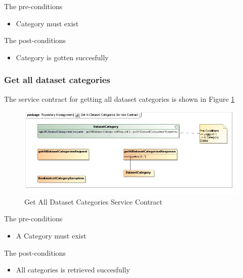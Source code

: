 The pre-conditions
\begin{itemize}
  \item Category must exist
\end{itemize}

The post-conditions
\begin{itemize}
  \item Category is gotten succesfully
\end{itemize}

\subsubsection {Get all dataset categories}

The service contract for getting all dataset categories is shown in Figure \ref{fig:getAllDatasetCatService}
\begin{figure}[H]
  \begin{center}
  \includegraphics[scale=0.6]{../Diagrams and Charts/Test Data/Get All Dataset Categories Service Contract.jpg}
  \caption{Get All Dataset Categories Service Contract}
  \label{fig:getAllDatasetCatService}
  \end{center}
  
\end{figure}

The pre-conditions
\begin{itemize}
  \item A Category must exist

\end{itemize}

The post-conditions
\begin{itemize}
  \item All categories is retrieved succesfully
\end{itemize}

